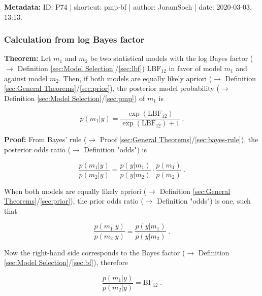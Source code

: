 \documentclass[a4paper,12pt,twoside]{book}
\begin{document}
\vspace{1em}
\textbf{Metadata:} ID: P74 | shortcut: pmp-bf | author: JoramSoch | date: 2020-03-03, 13:13.
\vspace{1em}



\subsubsection[\textbf{Calculation from log Bayes factor}]{Calculation from log Bayes factor} \label{sec:pmp-lbf}
\setcounter{equation}{0}

\textbf{Theorem:} Let $m_1$ and $m_2$ be two statistical models with the log Bayes factor ($\rightarrow$ Definition \ref{sec:Model Selection}/\ref{sec:lbf}) $\mathrm{LBF}_{12}$ in favor of model $m_1$ and against model $m_2$. Then, if both models are equally likely apriori ($\rightarrow$ Definition \ref{sec:General Theorems}/\ref{sec:prior}), the posterior model probability ($\rightarrow$ Definition \ref{sec:Model Selection}/\ref{sec:pmp}) of $m_1$ is

\begin{equation} \label{eq:pmp-lbf-PMP-LBF}
p(m_1|y) = \frac{\exp(\mathrm{LBF}_{12})}{\exp(\mathrm{LBF}_{12}) + 1} \; .
\end{equation}


\vspace{1em}
\textbf{Proof:} From Bayes' rule ($\rightarrow$ Proof \ref{sec:General Theorems}/\ref{sec:bayes-rule}), the posterior odds ratio ($\rightarrow$ Definition "odds") is

\begin{equation} \label{eq:pmp-lbf-post-odds-s1}
\frac{p(m_1|y)}{p(m_2|y)} = \frac{p(y|m_1)}{p(y|m_2)} \cdot \frac{p(m_1)}{p(m_2)} \; .
\end{equation}

When both models are equally likely apriori ($\rightarrow$ Definition \ref{sec:General Theorems}/\ref{sec:prior}), the prior odds ratio ($\rightarrow$ Definition "odds") is one, such that

\begin{equation} \label{eq:pmp-lbf-post-odds-s2}
\frac{p(m_1|y)}{p(m_2|y)} = \frac{p(y|m_1)}{p(y|m_2)} \; .
\end{equation}

Now the right-hand side corresponds to the Bayes factor ($\rightarrow$ Definition \ref{sec:Model Selection}/\ref{sec:bf}), therefore

\begin{equation} \label{eq:pmp-lbf-post-odds-s4}
\frac{p(m_1|y)}{p(m_2|y)} = \mathrm{BF}_{12} \; .
\end{equation}
\end{document}
